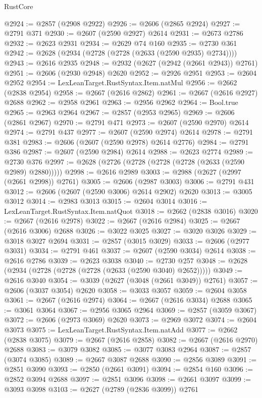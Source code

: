 \begin{lexlean}{RustCore}
\begin{coremodule}
@2924 := @2857 (@2908 @2922)
@2926 := @2606 (@2865 @2924)
@2927 := @2791 @371
@2930 := @2607 (@2590 @2927) @2614
@2931 := @2673 @2786
@2932 := @2623 @2931
@2934 := @2629 @74 @160
@2935 := @2730 @361
@2942 := @2628 (@2934 (@2728 (@2728 (@2633 (@2590 @2935) @2734))))
@2943 := @2616 @2935
@2948 := @2932 (@2627 (@2942 (@2661 @2943)) @2761)
@2951 := @2606 (@2930 @2948) @2620
@2952 := @2926 @2951
@2953 := @2604 @2952
@2954 := LexLeanTarget.RustSyntax.Item.natMul
@2956 := @2662 (@2838 @2954)
@2958 := @2667 (@2616 @2862)
@2961 := @2667 (@2616 @2927) @2688
@2962 := @2958 @2961
@2963 := @2956 @2962
@2964 := Bool.true
@2965 := @2963 @2964
@2967 := @2857 (@2953 @2965)
@2969 := @2606 (@2861 @2967)
@2970 := @2791 @471
@2973 := @2607 (@2590 @2970) @2614
@2974 := @2791 @437
@2977 := @2607 (@2590 @2974) @2614
@2978 := @2791 @381
@2983 := @2606 (@2607 (@2590 @2978) @2614 @2776)
@2984 := @2791 @386
@2987 := @2607 (@2590 @2984) @2614
@2988 := @2623 @2774
@2989 := @2730 @376
@2997 := @2628 (@2726 (@2728 (@2728 (@2728 (@2633 (@2590 @2989) @2880)))))
@2998 := @2616 @2989
@3003 := @2988 (@2627 (@2997 (@2661 @2998)) @2761)
@3005 := @2606 (@2987 @3003)
@3006 := @2791 @431
@3012 := @2606 (@2607 (@2590 @3006) @2614 @2902) @2620
@3013 := @3005 @3012
@3014 := @2983 @3013
@3015 := @2604 @3014
@3016 := LexLeanTarget.RustSyntax.Item.natQuot
@3018 := @2662 (@2838 @3016)
@3020 := @2667 (@2616 @2978)
@3022 := @2667 (@2616 @2984)
@3025 := @2667 (@2616 @3006) @2688
@3026 := @3022 @3025
@3027 := @3020 @3026
@3029 := @3018 @3027 @2694
@3031 := @2857 (@3015 @3029)
@3033 := @2606 (@2977 @3031)
@3034 := @2791 @461
@3037 := @2607 (@2590 @3034) @2614
@3038 := @2616 @2786
@3039 := @2623 @3038
@3040 := @2730 @257
@3048 := @2628 (@2934 (@2728 (@2728 (@2728 (@2633 (@2590 @3040) @2652)))))
@3049 := @2616 @3040
@3054 := @3039 (@2627 (@3048 (@2661 @3049)) @2761)
@3057 := @2606 (@3037 @3054) @2620
@3058 := @3033 @3057
@3059 := @2604 @3058
@3061 := @2667 (@2616 @2974)
@3064 := @2667 (@2616 @3034) @2688
@3065 := @3061 @3064
@3067 := @2956 @3065 @2964
@3069 := @2857 (@3059 @3067)
@3072 := @2606 (@2973 @3069) @2620
@3073 := @2969 @3072
@3074 := @2604 @3073
@3075 := LexLeanTarget.RustSyntax.Item.natAdd
@3077 := @2662 (@2838 @3075)
@3079 := @2667 (@2616 @2858)
@3082 := @2667 (@2616 @2970) @2688
@3083 := @3079 @3082
@3085 := @3077 @3083 @2964
@3087 := @2857 (@3074 @3085)
@3089 := @2667 @3087 @2688
@3090 := @2856 @3089
@3091 := @2851 @3090
@3093 := @2850 (@2661 @3091)
@3094 := @2854 @160
@3096 := @2852 @3094 @2688
@3097 := @2851 @3096
@3098 := @2661 @3097
@3099 := @3093 @3098
@3103 := @2627 (@2789 (@2836 @3099)) @2761

\end{coremodule}
\end{lexlean}
